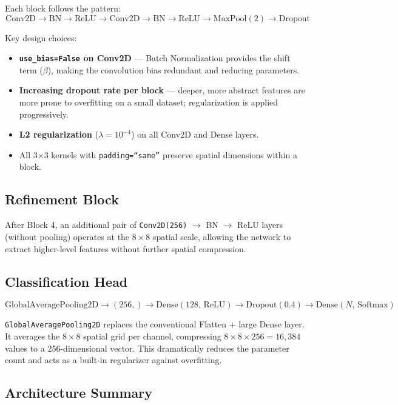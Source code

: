 \documentclass[12pt,a4paper]{article}
\begin{document}
Each block follows the pattern:
\[
\text{Conv2D} \to \text{BN} \to \text{ReLU} \to \text{Conv2D} \to \text{BN} \to \text{ReLU} \to \text{MaxPool}(2) \to \text{Dropout}
\]

Key design choices:
\begin{itemize}[noitemsep]
  \item \textbf{\texttt{use\_bias=False} on Conv2D} — Batch Normalization provides the shift term ($\beta$), making the convolution bias redundant and reducing parameters.
  \item \textbf{Increasing dropout rate per block} — deeper, more abstract features are more prone to overfitting on a small dataset; regularization is applied progressively.
  \item \textbf{L2 regularization} ($\lambda = 10^{-4}$) on all Conv2D and Dense layers.
  \item All 3$\times$3 kernels with \texttt{padding=``same''} preserve spatial dimensions within a block.
\end{itemize}

\subsection{Refinement Block}

After Block 4, an additional pair of \texttt{Conv2D(256)} $\to$ BN $\to$ ReLU layers (without pooling) operates at the $8 \times 8$ spatial scale, allowing the network to extract higher-level features without further spatial compression.

\subsection{Classification Head}

\[
\text{GlobalAveragePooling2D} \to (256,) \to \text{Dense}(128,\,\text{ReLU}) \to \text{Dropout}(0.4) \to \text{Dense}(N,\,\text{Softmax})
\]

\texttt{GlobalAveragePooling2D} replaces the conventional Flatten + large Dense layer. It averages the $8 \times 8$ spatial grid per channel, compressing $8 \times 8 \times 256 = 16{,}384$ values to a 256-dimensional vector. This dramatically reduces the parameter count and acts as a built-in regularizer against overfitting.

\subsection{Architecture Summary}
\end{document}
